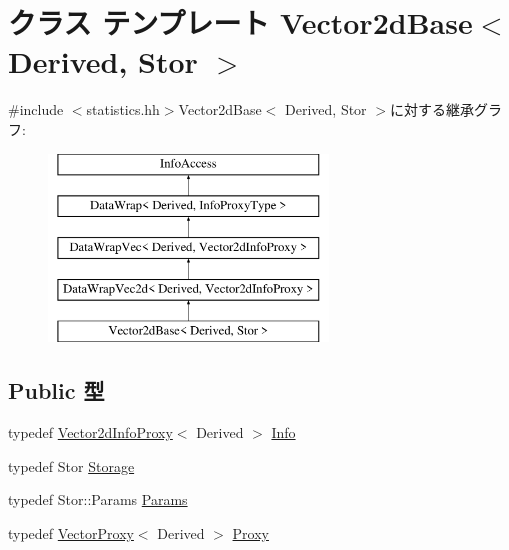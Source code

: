 \hypertarget{classStats_1_1Vector2dBase}{
\section{クラス テンプレート Vector2dBase$<$ Derived, Stor $>$}
\label{classStats_1_1Vector2dBase}
}


{\ttfamily \#include $<$statistics.hh$>$}Vector2dBase$<$ Derived, Stor $>$に対する継承グラフ:\begin{figure}[H]
\begin{center}
\leavevmode
\includegraphics[height=5cm]{classStats_1_1Vector2dBase}
\end{center}
\end{figure}
\subsection*{Public 型}
\begin{DoxyCompactItemize}
\item 
typedef \hyperlink{classStats_1_1Vector2dInfoProxy}{Vector2dInfoProxy}$<$ Derived $>$ \hyperlink{classStats_1_1Vector2dBase_a54a1e5a7adf65227680acc9effe631ac}{Info}
\item 
typedef Stor \hyperlink{classStats_1_1Vector2dBase_a5d4a6db0e7c32292f54a08d05c671bd1}{Storage}
\item 
typedef Stor::Params \hyperlink{classStats_1_1Vector2dBase_a24c5f88dc162c95e0b32ade67a7ea674}{Params}
\item 
typedef \hyperlink{classStats_1_1VectorProxy}{VectorProxy}$<$ Derived $>$ \hyperlink{classStats_1_1Vector2dBase_a7e8143c467f6c2e7fe9e1f4f051a6642}{Proxy}
\end{DoxyCompactItemize}
